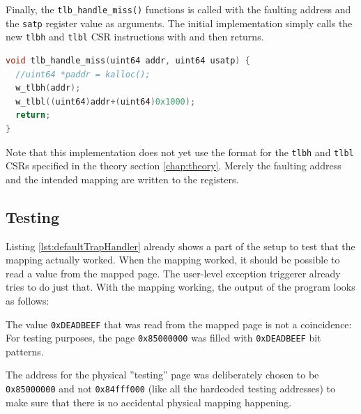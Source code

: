 Finally, the \texttt{tlb\_handle\_miss()} functions is called with the faulting address and the \texttt{satp} register
value as arguments.
The initial implementation simply calls the new \texttt{tlbh} and \texttt{tlbl} CSR instructions with and then
returns.
\begin{lstlisting}[language={C},float=h!,
    label={lst:defaultTrapHandler}, caption={Simple TLB miss exception handler for a single fixed address}]
void tlb_handle_miss(uint64 addr, uint64 usatp) {
  //uint64 *paddr = kalloc();
  w_tlbh(addr);
  w_tlbl((uint64)addr+(uint64)0x1000);
  return;
}
\end{lstlisting}

Note that this implementation does not yet use the format for the \texttt{tlbh} and \texttt{tlbl} CSRs specified
in the theory section \ref{chap:theory}.
Merely the faulting address and the intended mapping are written to the registers.

\subsection{Testing}
Listing \ref{lst:defaultTrapHandler} already shows a part of the setup to test that the mapping actually worked.
When the mapping worked, it should be possible to read a value from the mapped page.
The user-level exception triggerer already tries to do just that.
With the mapping working, the output of the program looks as follows:


The value \texttt{0xDEADBEEF} that was read from the mapped page is not a coincidence:
For testing purposes, the page \texttt{0x85000000} was filled with \texttt{0xDEADBEEF} bit patterns.

The address for the physical ''testing'' page was deliberately chosen to be \texttt{0x85000000} and not
\texttt{0x84fff000} (like all the hardcoded testing addresses) to make sure that there is no accidental physical
mapping happening.






